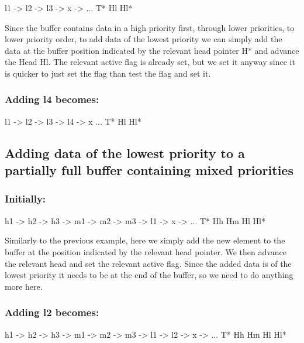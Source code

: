 \begin{DoxyCode}
l1  ->  l2  ->  l3  ->  x  ->  ...
T*
                Hl      Hl*
\end{DoxyCode}


Since the buffer contains data in a high priority first, through lower priorities, to lower priority order, to add data of the lowest priority we can simply add the data at the buffer position indicated by the relevant head pointer H$\ast$ and advance the Head Hl. The relevant active flag is already set, but we set it anyway since it is quicker to just set the flag than test the flag and set it.

\subsubsection*{Adding l4 becomes\+:}


\begin{DoxyCode}
l1  ->  l2  ->  l3  ->  l4  ->  x  ...
T*
                        Hl      Hl*
\end{DoxyCode}


\subsection*{Adding data of the lowest priority to a partially full buffer containing mixed priorities}

\subsubsection*{Initially\+:}


\begin{DoxyCode}
h1  ->  h2  ->  h3  -> m1  ->  m2  ->  m3  ->  l1  ->  x  ->  ...
T*
                Hh                     Hm      Hl      Hl*
\end{DoxyCode}


Similarly to the previous example, here we simply add the new element to the buffer at the position indicated by the relevant head pointer. We then advance the relevant head and set the relevant active flag. Since the added data is of the lowest priority it needs to be at the end of the buffer, so we need to do anything more here.

\subsubsection*{Adding l2 becomes\+:}


\begin{DoxyCode}
h1  ->  h2  ->  h3  -> m1  ->  m2  ->  m3  ->  l1  ->  l2  ->  x  ->  ...
T*
                Hh                     Hm              Hl      Hl*
\end{DoxyCode}


